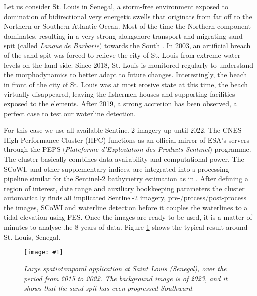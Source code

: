 \documentclass[remotesensing,article,submit,pdftex,moreauthors]{Definitions/mdpi}
\newcommand{\myfigure}[4]{
    \begin{figure*}[ht!]
        \centering
        \texttt{[image: \#1]}	 
        \caption{\itshape#2}
        \label{#3}
    \end{figure*} 
}
\begin{document}
Let us consider St. Louis in Senegal, a storm-free environment exposed to domination of bidirectional very energetic swells that originate from far off to the Northern or Southern Atlantic Ocean. Most of the time the Northern component dominates, resulting in a very strong alongshore transport and migrating sand-spit (called \textit{Langue de Barbarie}) towards the South \citep{bergsma2020sand, taveneau2021observing}. In 2003, an artificial breach of the sand-spit was forced to relieve the city of St. Louis from extreme water levels on the land-side. Since 2018, St. Louis is monitored regularly to understand the morphodynamics to better adapt to future changes. Interestingly, the beach in front of the city of St. Louis was at most erosive state at this time, the beach virtually disappeared, leaving the fishermen houses and supporting facilities exposed to the elements. After 2019, a strong accretion has been observed, a perfect case to test our waterline detection. 

For this case we use all available Sentinel-2 imagery up until 2022. The CNES High Performance Cluster (HPC) functions as an official mirror of ESA's servers through the PEPS (\textit{Plateforme d'Exploitation des Produits Sentinel}) programme. The cluster basically combines data availability and computational power. The SCoWI, and other supplementary indices, are integrated into a processing pipeline similar for the Sentinel-2 bathymetry estimation as in \citet{daly2022new}. After defining a region of interest, date range and auxiliary bookkeeping parameters the cluster automatically finds all implicated Sentinel-2 imagery, pre-/process/post-process the images, SCoWI and waterline detection before it couples the waterlines to a tidal elevation using FES. Once the images are ready to be used, it is a matter of minutes to analyse the 8 years of data. Figure \ref{senegal} shows the typical result around St. Louis, Senegal.

\myfigure{img/senegal_stLouis_thinLines.png}{Large spatiotemporal application at Saint Louis (Senegal), over the period from 2015 to 2022. The background image is of 2023, and it shows that the sand-spit has even progressed Southward.}{senegal}{1}
\end{document}
